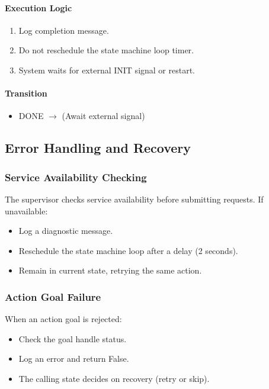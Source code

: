\paragraph{Execution Logic}

\begin{enumerate}
    \item Log completion message.
    \item Do not reschedule the state machine loop timer.
    \item System waits for external INIT signal or restart.
\end{enumerate}

\paragraph{Transition}

\begin{itemize}
    \item DONE $\rightarrow$ (Await external signal)
\end{itemize}

\subsection{Error Handling and Recovery}

\subsubsection{Service Availability Checking}

The supervisor checks service availability before submitting requests. If unavailable:
\begin{itemize}
    \item Log a diagnostic message.
    \item Reschedule the state machine loop after a delay (2 seconds).
    \item Remain in current state, retrying the same action.
\end{itemize}

\subsubsection{Action Goal Failure}

When an action goal is rejected:
\begin{itemize}
    \item Check the goal handle status.
    \item Log an error and return False.
    \item The calling state decides on recovery (retry or skip).
\end{itemize}

